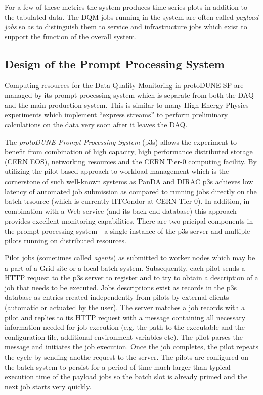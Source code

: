 \documentclass{webofc}
\newcommand{\pd}{protoDUNE\xspace}
\begin{document}
For a few of these metrics the system produces time-series plots in addition to the tabulated data.
The DQM jobs running in the system are often called \textit{payload jobs} so as to distinguish
them to service and infrastructure jobs which exist to support the function of the overall system.


\subsection{Design of the Prompt Processing System}

Computing resources for the Data Quality Monitoring in \pd-SP are managed by its prompt processing system
which is separate from both the DAQ and the main production system. This is similar to many High-Energy Physics
experiments which implement ``express streams'' to perform preliminary calculations on the data very soon
after it leaves the DAQ.

The \textit{\pd Prompt Processing System} (p3s) allows the experiment to benefit from combination of high capacity, high
performance distributed storage (CERN EOS), networking resources and the CERN Tier-0 computing facility.
By utilizing the pilot-based approach to workload management which is the cornerstone of such well-known
systems as PanDA and DIRAC \cite{panda,dirac} p3s achieves low latency of automated job submission
as compared to running jobs directly on the batch trsource (which is currently HTCondor at CERN Tier-0).
In addition, in combination with a Web service (and its back-end database) this approach provides excellent
monitoring capabilities. There are two pricipal components in the prompt processing system - a single instance
of the p3s server and multiple pilots running on distributed resources.

Pilot jobs (sometimes called \textit{agents}) as submitted to worker nodes which may be
a part of a Grid site or a local batch system. Subsequently, each pilot sends a HTTP request to the p3s server
to register and to try to obtain a description of a job that needs to be executed.
Jobs descriptions exist as records in the p3s database as entries created independently from pilots by
external clients (automatic or actuated by the user). The server matches a job records with a pilot and
replies to its HTTP request with a message containing all necessary information needed for job
execution (e.g. the path to the executable and the configuration file, additional environment variables etc).
The pilot parses the message and initiates the job  execution. Once the job completes, the pilot repeats the cycle
by sending anothe request to the server. The pilots are configured on the batch system to persist for a period
of time much larger than typical execution time of the payload  jobs so the batch slot is already primed and the next
job starts very quickly.
\end{document}
